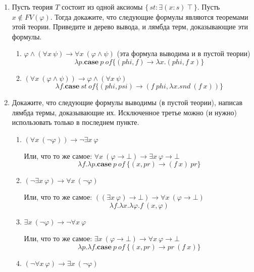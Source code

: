 \begin{enumerate}
\item Пусть теория $T$ состоит из одной аксиомы $\{\,st : \exists (x : s)\ \top\,\}$.
    Пусть $x \notin FV(\varphi)$.
    Тогда докажите, что следующие формулы являются теоремами этой теории.
    Приведите и дерево вывода, и лямбда терм, доказывающие эти формулы.
\begin{enumerate}
\item $\varphi \land (\forall x\ \psi) \to \forall x\ (\varphi \land \psi)$ (эта формула выводима и в пустой 
теории)
\begin{equation*}
	\lambda p. \mathbf{case} \ p \ of \{ (phi, f) \to \lambda x.(phi, f \ x) \}
\end{equation*}
\item $(\forall x\ (\varphi \land \psi)) \to \varphi \land (\forall x\ \psi)$
\begin{equation*}
	\lambda f. \mathbf{case} \ st \ of \{ (phi, psi) \to (f\ phi, \lambda x. snd \ (f \ x)) \}
\end{equation*}
\end{enumerate}

\item Докажите, что следующие формулы выводимы (в пустой теории), написав лямбда термы, доказывающие их.
    Исключенное третье можно (и нужно) использовать только в последнем пункте.
\begin{enumerate}
\item $(\forall x\ (\neg \varphi)) \to \neg \exists x\ \varphi$

Или, что то же самое: $\forall x\ (\varphi \to \bot) \to \exists x\ \varphi \to \bot$
\begin{equation*}
	\lambda f.\lambda p. \mathbf{case} \ p \ of \ \{(x, pr) \to (f \ x) \ pr\}
\end{equation*}
\item $(\neg \exists x\ \varphi) \to \forall x\ (\neg \varphi)$

Или, что то же самое:  $((\exists x\ \varphi) \to \bot) \to \forall x\ (\varphi \to \bot)$
\begin{equation*}
	\lambda f.\lambda x. \lambda \varphi .f \ (x, \varphi) 
\end{equation*}
\item $\exists x\ (\neg \varphi) \to \neg \forall x\ \varphi$

Или, что то же самое:  $\exists x\ (\varphi \to \bot) \to \forall x\ \varphi \to \bot$
\begin{equation*}
	\lambda p. \lambda f. \mathbf{case} \ p \ of \ \{(x, pr) \to pr \ (f \ x)\}
\end{equation*}
\item $(\neg \forall x\ \varphi) \to \exists x\ (\neg \varphi)$


\end{enumerate}
\end{enumerate}
